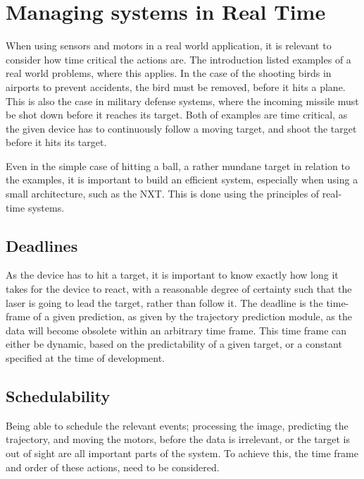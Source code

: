 
\section{Managing systems in Real Time}
\label{sec:rts-intro}
When using sensors and motors in a real world application, it is relevant to consider how time critical the actions are.
The introduction listed examples of a real world problems, where this applies.
In the case of the shooting birds in airports to prevent accidents, the bird must be removed, before it hits a plane.
This is also the case in military defense systems, where the incoming missile must be shot down before it reaches its target. 
Both of examples are time critical, as the given device has to continuously follow a moving target, and shoot the target before it hits its target.

Even in the simple case of hitting a ball, a rather mundane target in relation to the examples, it is important to build an efficient system, especially when using a small architecture, such as the NXT.
This is done using the principles of real-time systems.

\subsection{Deadlines}
As the device has to hit a target, it is important to know exactly how long it takes for the device to react, with a reasonable degree of certainty such that the laser is going to lead the target, rather than follow it. 
The deadline is the time-frame of a given prediction, as given by the trajectory prediction module, as the data will become obsolete within an arbitrary time frame.
This time frame can either be dynamic, based on the predictability of a given target, or a constant specified at the time of development.

\subsection{Schedulability}
Being able to schedule the relevant events; processing the image, predicting the trajectory, and moving the motors, before the data is irrelevant, or the target is out of sight are all important parts of the system.
To achieve this, the time frame and order of these actions, need to be considered. 
\\\\
